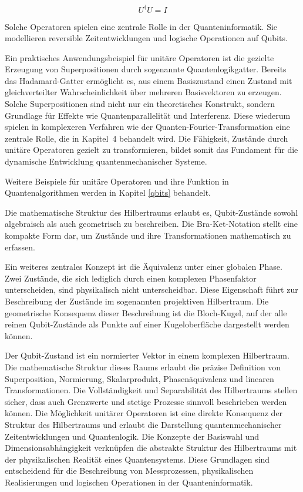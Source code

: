 \[
U^\dagger U = I
\]

Solche Operatoren spielen eine zentrale Rolle in der Quanteninformatik. Sie modellieren reversible Zeitentwicklungen und logische Operationen auf Qubits.

Ein praktisches Anwendungsbeispiel für unitäre Operatoren ist die gezielte Erzeugung von Superpositionen durch sogenannte Quantenlogikgatter. Bereits das Hadamard-Gatter ermöglicht es, aus einem Basiszustand einen Zustand mit gleichverteilter Wahrscheinlichkeit über mehreren Basisvektoren zu erzeugen. Solche Superpositionen sind nicht nur ein theoretisches Konstrukt, sondern Grundlage für Effekte wie Quantenparallelität und Interferenz. Diese wiederum spielen in komplexeren Verfahren wie der Quanten-Fourier-Transformation eine zentrale Rolle, die in Kapitel~4 behandelt wird. Die Fähigkeit, Zustände durch unitäre Operatoren gezielt zu transformieren, bildet somit das Fundament für die dynamische Entwicklung quantenmechanischer Systeme.

Weitere Beispiele für unitäre Operatoren und ihre Funktion in Quantenalgorithmen werden in Kapitel \ref{qbits} behandelt.



Die mathematische Struktur des Hilbertraums erlaubt es, Qubit-Zustände sowohl algebraisch als auch geometrisch zu beschreiben. Die Bra-Ket-Notation stellt eine kompakte Form dar, um Zustände und ihre Transformationen mathematisch zu erfassen. 

Ein weiteres zentrales Konzept ist die Äquivalenz unter einer globalen Phase. Zwei Zustände, die sich lediglich durch einen komplexen Phasenfaktor unterscheiden, sind physikalisch nicht unterscheidbar. Diese Eigenschaft führt zur Beschreibung der Zustände im sogenannten projektiven Hilbertraum. Die geometrische Konsequenz dieser Beschreibung ist die Bloch-Kugel, auf der alle reinen Qubit-Zustände als Punkte auf einer Kugeloberfläche dargestellt werden können.


Der Qubit-Zustand ist ein normierter Vektor in einem komplexen Hilbertraum. Die mathematische Struktur dieses Raums erlaubt die präzise Definition von Superposition, Normierung, Skalarprodukt, Phasenäquivalenz und linearen Transformationen. Die Vollständigkeit und Separabilität des Hilbertraums stellen sicher, dass auch Grenzwerte und stetige Prozesse sinnvoll beschrieben werden können. Die Möglichkeit unitärer Operatoren ist eine direkte Konsequenz der Struktur des Hilbertraums und erlaubt die Darstellung quantenmechanischer Zeitentwicklungen und Quantenlogik. Die Konzepte der Basiswahl und Dimensionsabhängigkeit verknüpfen die abstrakte Struktur des Hilbertraums mit der physikalischen Realität eines Quantensystems. Diese Grundlagen sind entscheidend für die Beschreibung von Messprozessen, physikalischen Realisierungen und logischen Operationen in der Quanteninformatik.

